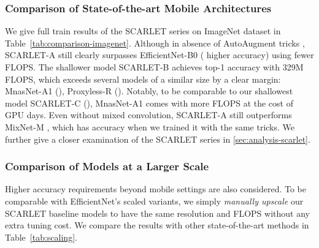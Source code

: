 \documentclass[10pt,twocolumn,letterpaper]{article}
\theoremstyle{definition}
\begin{document}
\subsubsection{Comparison of State-of-the-art Mobile Architectures}

We give full train results of the SCARLET series on ImageNet dataset in Table~\ref{tab:comparison-imagenet}. Although in absence of AutoAugment tricks \cite{cubuk2018autoaugment}, SCARLET-A still clearly surpasses EfficientNet-B0  ( higher accuracy)  using fewer FLOPS.  The shallower model SCARLET-B achieves  top-1 accuracy with 329M FLOPS, which exceeds several models of a similar size by a clear margin: MnasNet-A1 (), Proxyless-R (). Notably, to be comparable to our shallowest model SCARLET-C (), MnasNet-A1 comes with  more FLOPS at the cost of  GPU days. Even without mixed convolution, SCARLET-A  still outperforms MixNet-M \cite{tan2020mixconv}, which has  accuracy when we trained it with the same tricks.
We further give a closer examination of the SCARLET series in \ref{sec:analysis-scarlet}.

\subsubsection{Comparison of Models at a Larger Scale}
Higher accuracy requirements beyond mobile settings are also considered. To be comparable with EfficientNet's scaled variants, we simply \emph{manually upscale} our SCARLET baseline models to have the same resolution and FLOPS without any extra tuning cost. We compare the results with other state-of-the-art methods in Table~\ref{tab:scaling}. 
\end{document}
